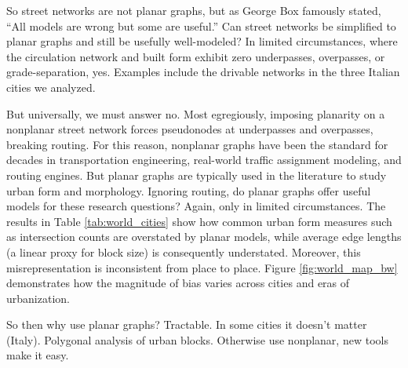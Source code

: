 \documentclass[Afour,sageh,times]{sagej}
\begin{document}
So street networks are not planar graphs, but as George Box famously stated, \enquote{All models are wrong but some are useful.} Can street networks be simplified to planar graphs and still be usefully well-modeled? In limited circumstances, where the circulation network and built form exhibit zero underpasses, overpasses, or grade-separation, yes. Examples include the drivable networks in the three Italian cities we analyzed.

But universally, we must answer no. Most egregiously, imposing planarity on a nonplanar street network forces pseudonodes at underpasses and overpasses, breaking routing. For this reason, nonplanar graphs have been the standard for decades in transportation engineering, real-world traffic assignment modeling, and routing engines. But planar graphs are typically used in the literature to study urban form and morphology. Ignoring routing, do planar graphs offer useful models for these research questions? Again, only in limited circumstances. The results in Table \ref{tab:world_cities} show how common urban form measures such as intersection counts are overstated by planar models, while average edge lengths (a linear proxy for block size) is consequently understated. Moreover, this misrepresentation is inconsistent from place to place. Figure \ref{fig:world_map_bw} demonstrates how the magnitude of bias varies across cities and eras of urbanization.

So then why use planar graphs? Tractable. In some cities it doesn't matter (Italy). Polygonal analysis of urban blocks. Otherwise use nonplanar, new tools make it easy.





\clearpage


\end{document}
